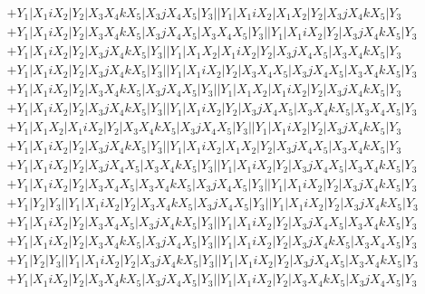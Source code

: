 \documentclass{article}[12pt]
\begin{document}
\begin{align*}
 & +Y_1|X_1iX_2|Y_2|X_3X_4kX_5|X_3jX_4X_5|Y_3||Y_1|X_1iX_2|X_1X_2|Y_2|X_3jX_4kX_5|Y_3\\ 
 & +Y_1|X_1iX_2|Y_2|X_3X_4kX_5|X_3jX_4X_5|X_3X_4X_5|Y_3||Y_1|X_1iX_2|Y_2|X_3jX_4kX_5|Y_3\\ 
 & +Y_1|X_1iX_2|Y_2|X_3jX_4kX_5|Y_3||Y_1|X_1X_2|X_1iX_2|Y_2|X_3jX_4X_5|X_3X_4kX_5|Y_3\\ 
 & +Y_1|X_1iX_2|Y_2|X_3jX_4kX_5|Y_3||Y_1|X_1iX_2|Y_2|X_3X_4X_5|X_3jX_4X_5|X_3X_4kX_5|Y_3\\ 
 & +Y_1|X_1iX_2|Y_2|X_3X_4kX_5|X_3jX_4X_5|Y_3||Y_1|X_1X_2|X_1iX_2|Y_2|X_3jX_4kX_5|Y_3\\ 
 & +Y_1|X_1iX_2|Y_2|X_3jX_4kX_5|Y_3||Y_1|X_1iX_2|Y_2|X_3jX_4X_5|X_3X_4kX_5|X_3X_4X_5|Y_3\\ 
 & +Y_1|X_1X_2|X_1iX_2|Y_2|X_3X_4kX_5|X_3jX_4X_5|Y_3||Y_1|X_1iX_2|Y_2|X_3jX_4kX_5|Y_3\\ 
 & +Y_1|X_1iX_2|Y_2|X_3jX_4kX_5|Y_3||Y_1|X_1iX_2|X_1X_2|Y_2|X_3jX_4X_5|X_3X_4kX_5|Y_3\\ 
 & +Y_1|X_1iX_2|Y_2|X_3jX_4X_5|X_3X_4kX_5|Y_3||Y_1|X_1iX_2|Y_2|X_3jX_4X_5|X_3X_4kX_5|Y_3\\ 
 & +Y_1|X_1iX_2|Y_2|X_3X_4X_5|X_3X_4kX_5|X_3jX_4X_5|Y_3||Y_1|X_1iX_2|Y_2|X_3jX_4kX_5|Y_3\\ 
 & +Y_1|Y_2|Y_3||Y_1|X_1iX_2|Y_2|X_3X_4kX_5|X_3jX_4X_5|Y_3||Y_1|X_1iX_2|Y_2|X_3jX_4kX_5|Y_3\\ 
 & +Y_1|X_1iX_2|Y_2|X_3X_4X_5|X_3jX_4kX_5|Y_3||Y_1|X_1iX_2|Y_2|X_3jX_4X_5|X_3X_4kX_5|Y_3\\ 
 & +Y_1|X_1iX_2|Y_2|X_3X_4kX_5|X_3jX_4X_5|Y_3||Y_1|X_1iX_2|Y_2|X_3jX_4kX_5|X_3X_4X_5|Y_3\\  
 & +Y_1|Y_2|Y_3||Y_1|X_1iX_2|Y_2|X_3jX_4kX_5|Y_3||Y_1|X_1iX_2|Y_2|X_3jX_4X_5|X_3X_4kX_5|Y_3\\ 
 & +Y_1|X_1iX_2|Y_2|X_3X_4kX_5|X_3jX_4X_5|Y_3||Y_1|X_1iX_2|Y_2|X_3X_4kX_5|X_3jX_4X_5|Y_3\end{align*}
 
 
\end{document}
